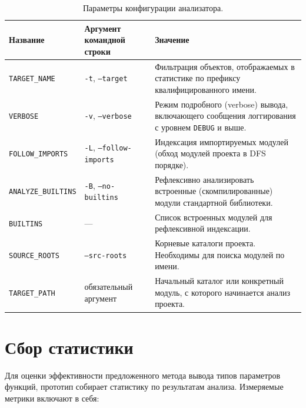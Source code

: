 \begin{table}[H]
  \small
  \caption{Параметры конфигурации анализатора.}
  \label{tab:config-ref}
  \begin{tabularx}{\textwidth}{ |X|X|X| }
    \hline
    Название & Аргумент командной строки & Значение \\
    \hline
    \texttt{TARGET\_NAME} & \texttt{-t}, \texttt{--target} &  Фильтрация
    объектов, отображаемых в статистике по префиксу квалифицированного имени.
    \\ \hline

    \texttt{VERBOSE} & \texttt{-v}, \texttt{--verbose} & Режим подробного
    (verbose) вывода, включающего сообщения логгирования с уровнем
    \texttt{DEBUG} и выше.
    \\ \hline

    \texttt{FOLLOW\_IMPORTS} & \texttt{-L}, \texttt{--follow-imports} & 
    Индексация импортируемых модулей (обход модулей проекта в DFS порядке).
    \\ \hline

    \texttt{ANALYZE\_BUILTINS} & \texttt{-B}, \texttt{--no-builtins} &
    Рефлексивно анализировать встроенные (скомпилированные) модули стандартной
    библиотеки.
    \\ \hline

    \texttt{BUILTINS} & --- & Список встроенных модулей для рефлексивной
    индексации.
    \\ \hline
    
    \texttt{SOURCE\_ROOTS} & \texttt{--src-roots} & Корневые каталоги проекта.
    Необходимы для поиска модулей по имени.  
    \\ \hline

    \texttt{TARGET\_PATH} & обязательный аргумент & Начальный каталог или
    конкретный модуль, с которого начинается анализ проекта.
    \\ \hline

  \end{tabularx}
\end{table}

\section{Сбор статистики}
\label{sec:statistics-collecting}

Для оценки эффективности предложенного метода вывода типов параметров функций,
прототип собирает статистику по результатам анализа. Измеряемые метрики включают
в себя:

